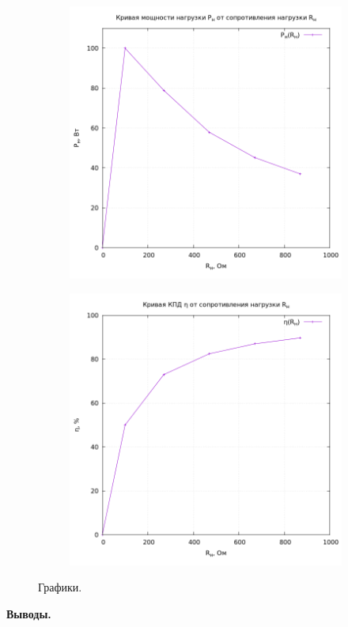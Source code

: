 \documentclass[12pt, a4paper]{report}
\begin{document}
\begin{enumerate}
\begin{figure}[H]
\begin{subfigure}{0.5\linewidth}
				\end{subfigure}
				\medskip
				\begin{subfigure}{0.5\linewidth}
					\includegraphics[width=\linewidth]{P_n_R.png}
				\end{subfigure}
				\begin{subfigure}{0.5\linewidth}
					\includegraphics[width=\linewidth]{n_R.png}
				\end{subfigure}

				\caption{Графики.}
				\label{plots}
			\end{figure}
	\end{enumerate}

	\begin{center}
		\textbf{Выводы.}
	\end{center}
\end{document}
